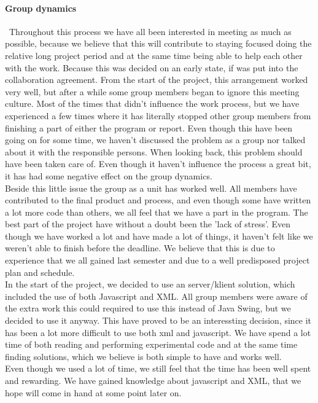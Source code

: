\documentclass[a4paper,10pt,titlepage]{article}
\begin{document}
		\paragraph{Group dynamics}\mbox{}\
		Throughout this process we have all been interested in meeting as much as possible, because we believe that this will contribute to staying focused doing the relative long project period and at the same time being able to help each other with the work. Because this was decided on an early state, if was put into the collaboration agreement. From the start of the project, this arrangement worked very well, but after a while some group members began to ignore this meeting culture. Most of the times that didn't influence the work process, but we have experienced a few times where it has literally stopped other group members from finishing a part of either the program or report. Even though this have been going on for some time, we haven't discussed the problem as a group nor talked about it with the responsible persons. When looking back, this problem should have been taken care of. Even though it haven't influence the process a great bit, it has had some negative effect on the group dynamics. \\
		Beside this little issue the group as a unit has worked well. All members have contributed to the final product and process, and even though some have written a lot more code than others, we all feel that we have a part in the program. The best part of the project have without a doubt been the 'lack of stress'. Even though we have worked a lot and have made a lot of things, it haven't felt like we weren't able to finish before the deadline. We believe that this is due to experience that we all gained last semester and due to a well predisposed project plan and schedule. \\

In the start of the project, we decided to use an server/klient solution, which included the use of both Javascript and XML. All group members were aware of the extra work this could required to use this instead of Java Swing, but we decided to use it anyway. This have proved to be an interessting decision, since it has been a lot more difficult to use both xml and javascript. We have spend a lot time of both reading and performing experimental code and at the same time finding solutions, which we believe is both simple to have and works well.\\
Even though we used a lot of time, we still feel that the time has been well spent and rewarding. We have gained knowledge about javascript and XML, that we hope will come in hand at some point later on.\\
\end{document}
